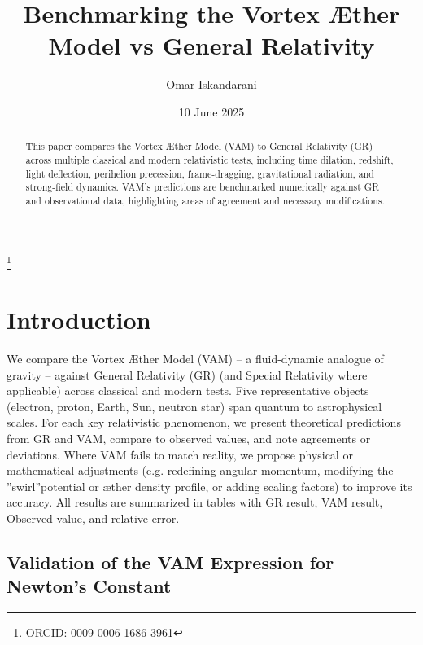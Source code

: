 \documentclass[a4paper, aps,preprint,superscriptaddress, 12pt]{revtex4}
\providecommand{\grqq}{\textquotedblright}
\begin{document}
    \author{Omar Iskandarani}
    \title{Benchmarking the Vortex Æther Model vs General Relativity}
    \date{10 June 2025}
    \thanks{ORCID: \href{https://orcid.org/0009-0006-1686-3961}{0009-0006-1686-3961}}

    \begin{abstract}
    This paper compares the Vortex Æther Model (VAM) to General Relativity (GR) across multiple classical and modern relativistic tests, including time dilation, redshift, light deflection, perihelion precession, frame-dragging, gravitational radiation, and strong-field dynamics. VAM's predictions are benchmarked numerically against GR and observational data, highlighting areas of agreement and necessary modifications.
    \end{abstract}

  \maketitle

    
\section*{Introduction}
We compare the Vortex Æther Model (VAM) – a fluid-dynamic analogue of gravity – against General Relativity (GR) (and Special Relativity where applicable) across classical and modern tests. Five representative objects (electron, proton, Earth, Sun, neutron star) span quantum to astrophysical scales. For each key relativistic phenomenon, we present theoretical predictions from GR and VAM, compare to observed values, and note agreements or deviations. Where VAM fails to match reality, we propose physical or mathematical adjustments (e.g. redefining angular momentum, modifying the \grqq swirl\textquotedblright potential or æther density profile, or adding scaling factors) to improve its accuracy. All results are summarized in tables with GR result, VAM result, Observed value, and relative error.

\subsection*{Validation of the VAM Expression for Newton's Constant}
\end{document}
